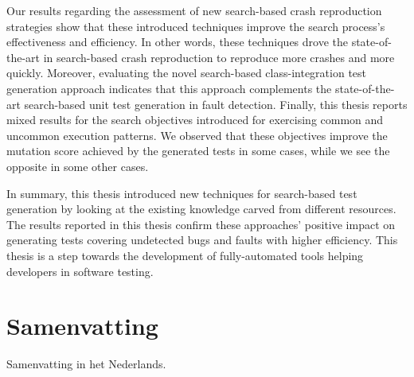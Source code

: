 Our results regarding the assessment of new search-based crash reproduction strategies show that these introduced techniques improve the search process's effectiveness and efficiency. In other words, these techniques drove the state-of-the-art in search-based crash reproduction to reproduce more crashes and more quickly. 
Moreover, evaluating the novel search-based class-integration test generation approach indicates that this approach complements the state-of-the-art search-based unit test generation in fault detection. 
Finally, this thesis reports mixed results for the search objectives introduced for exercising common and uncommon execution patterns. We observed that these objectives improve the mutation score achieved by the generated tests in some cases, while we see the opposite in some other cases.

In summary, this thesis introduced new techniques for search-based test generation by looking at the existing knowledge carved from different resources. The results reported in this thesis confirm these approaches' positive impact on generating tests covering undetected bugs and faults with higher efficiency. This thesis is a step towards the development of fully-automated tools helping developers in software testing.
\chapter*{Samenvatting}

{

  Samenvatting in het Nederlands.
}



